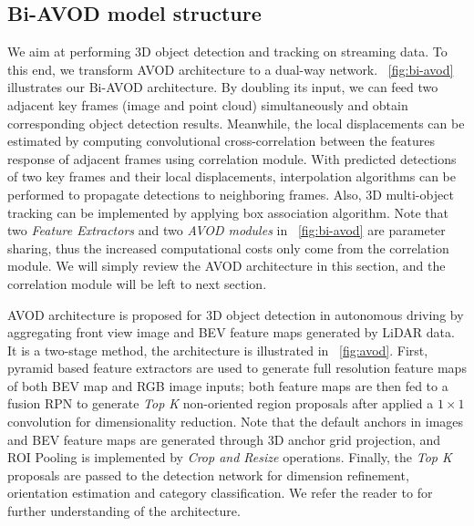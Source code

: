 \documentclass{bmvc2k}
\begin{document}
\subsection{Bi-AVOD model structure}
We aim at performing 3D object detection and tracking on streaming data. To this end, we transform AVOD\cite{ku2018joint} architecture to a dual-way network. \figurename \, \ref{fig:bi-avod} illustrates our Bi-AVOD architecture. By doubling its input, we can feed two adjacent key frames (image and point cloud) simultaneously and obtain corresponding object detection results. Meanwhile, the local displacements can be estimated by computing convolutional cross-correlation between the features response of adjacent frames using correlation module. With predicted detections of two key frames and their local displacements, interpolation algorithms can be performed to propagate detections to neighboring frames. Also, 3D multi-object tracking can be implemented by applying box association algorithm. Note that two \textit{Feature Extractors} and two \textit{AVOD modules} in \figurename \, \ref{fig:bi-avod} are parameter sharing, thus the increased computational costs only come from the correlation module. We will simply review the AVOD architecture in this section, and the correlation module will be left to next section.

AVOD\cite{ku2018joint} architecture is proposed for 3D object detection in autonomous driving by aggregating front view image and BEV feature maps generated by LiDAR data. It is a two-stage method, the architecture is illustrated in \figurename \, \ref{fig:avod}. First, pyramid based feature extractors are used to generate full resolution feature maps of both BEV map and RGB image inputs; both feature maps are then fed to a fusion RPN to generate \textit{Top K} non-oriented region proposals after applied a $1 \times 1$ convolution for dimensionality reduction. Note that the default anchors in images and BEV feature maps are generated through 3D anchor grid projection, and ROI Pooling is implemented by \textit{Crop and Resize} operations. Finally, the \textit{Top K} proposals are passed to the detection network for dimension refinement, orientation estimation and category classification. We refer the reader to \cite{ku2018joint} for further understanding of the architecture.
\end{document}
